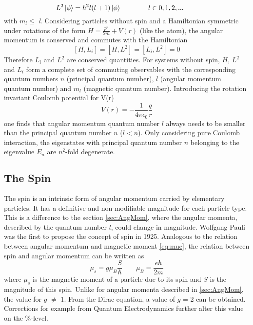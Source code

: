 \begin{equation}
\label{eq:l}
 L^{2}\ket{\phi}=\hbar^{2}l(l+1)\ket{\phi} \hspace{1.4cm} l\in{0,1,2,...} \hspace{2em}
\end{equation} 
with \textbar\textit{$m_{l}$}\textbar $\leq$ \textit{l}. Considering particles without spin and a Hamiltonian symmetric under rotations of the form $H=\frac{p^{2}}{2m}+V(r)$ (like the atom), the angular momentum is conserved and commutes with the Hamiltonian
\begin{equation}
\label{eq:commutatorL3}
 [H,L_{i}]=[H,L^{2}]=[L_{i},L^{2}]=0
\end{equation} 
Therefore $L_{i}$ and $L^{2}$ are conserved quantities. For systems without spin, $H$, $L^{2}$ and $L_{i}$ form a complete set of commuting observables with the corresponding quantum numbers $n$ (principal quantum number), $l$ (angular momentum quantum number) and $m_{l}$ (magnetic quantum number). Introducing the rotation invariant Coulomb potential for V(r)
\begin{equation}
 V(r)=-\frac{1}{4\pi\epsilon_{0}}\frac{q}{r}
\end{equation} 
one finds that angular momentum quantum number $l$ always needs to be smaller than the principal quantum number $n$ ($l<n$). Only considering pure Coulomb interaction, the eigenstates with principal quantum number $n$ belonging to the eigenvalue $E_{n}$ are $n^{2}$-fold degenerate.
 
\subsection{The Spin}
\label{sec:Spin}


The spin is an intrinsic form of angular momentum carried by elementary particles. It has a definitive and non-modifiable magnitude for each particle type. This is a difference to the section \ref{sec:AngMom}, where the angular momenta, described by the quantum number $l$, could change in magnitude. Wolfgang Pauli was the first to propose the concept of spin in 1925. Analogous to the relation between angular momentum and magnetic moment \ref{eq:mue}, the relation between spin and angular momentum can be written as
\begin{equation}
 \mu_{s} = g\mu_{B}\frac{S}{\hbar} \hspace{2em} \mu_{B} = \frac{e\hbar}{2m}
\end{equation} 
where $\mu_{s}$ is the magnetic moment of a particle due to its spin and $S$ is the magnitude of this spin. Unlike for angular momenta described in \ref{sec:AngMom}, the value for $g$ $\neq$ 1. From the Dirac equation, a value of $g$ = 2 can be obtained. Corrections for example from Quantum Electrodynamics further alter this value on the \%-level. 

